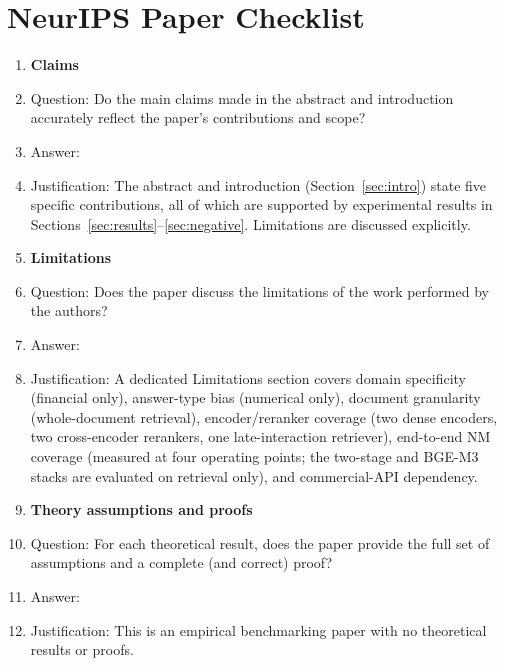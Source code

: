\section*{NeurIPS Paper Checklist}

\begin{enumerate}

\item {\bf Claims}
    \item[] Question: Do the main claims made in the abstract and introduction accurately reflect the paper's contributions and scope?
    \item[] Answer: \answerYes{}
    \item[] Justification: The abstract and introduction (Section~\ref{sec:intro}) state five specific contributions, all of which are supported by experimental results in Sections~\ref{sec:results}--\ref{sec:negative}. Limitations are discussed explicitly.

\item {\bf Limitations}
    \item[] Question: Does the paper discuss the limitations of the work performed by the authors?
    \item[] Answer: \answerYes{}
    \item[] Justification: A dedicated Limitations section covers domain specificity (financial only), answer-type bias (numerical only), document granularity (whole-document retrieval), encoder/reranker coverage (two dense encoders, two cross-encoder rerankers, one late-interaction retriever), end-to-end NM coverage (measured at four operating points; the two-stage and BGE-M3 stacks are evaluated on retrieval only), and commercial-API dependency.

\item {\bf Theory assumptions and proofs}
    \item[] Question: For each theoretical result, does the paper provide the full set of assumptions and a complete (and correct) proof?
    \item[] Answer: \answerNA{}
    \item[] Justification: This is an empirical benchmarking paper with no theoretical results or proofs.


\end{enumerate}
